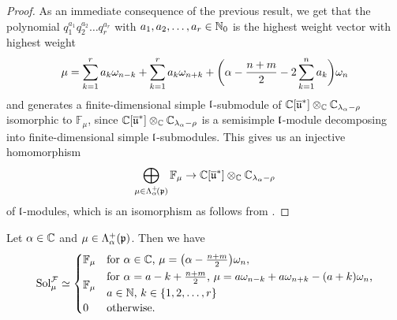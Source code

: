 \begin{proof}
As an immediate consequence of the previous result, we get that the polynomial $q_1^{a_1}q_2^{a_2}\dots q_r^{a_r}$ with $a_1,a_2,\dots,a_r \in \mathbb{N}_0$ is the highest weight vector with highest weight
\begin{align*}
\mu=\sum_{k=1}^r a_k \omega_{n-k} + \sum_{k=1}^r a_k \omega_{n+k} + \bigg(\alpha - {n+m \over 2} - 2\sum_{k=1}^n a_k\bigg) \omega_n
\end{align*}
and generates a finite-dimensional simple $\mathfrak{l}$-submodule of $\mathbb{C}[\overline{\mathfrak{u}}^*] \otimes_{\mathbb{C}} \mathbb{C}_{\lambda_\alpha-\rho}$ isomorphic to $\mathbb{F}_\mu$, since $\mathbb{C}[\overline{\mathfrak{u}}^*] \otimes_{\mathbb{C}} \mathbb{C}_{\lambda_\alpha-\rho}$ is a semisimple $\mathfrak{l}$-module decomposing into finite-dimensional simple $\mathfrak{l}$-submodules. This gives us an injective homomorphism
\begin{align*}
  \bigoplus_{\mu \in \Lambda^+_\alpha\!(\mathfrak{p})} \mathbb{F}_\mu \rightarrow \mathbb{C}[\overline{\mathfrak{u}}^*] \otimes_{\mathbb{C}} \mathbb{C}_{\lambda_\alpha-\rho}
\end{align*}
of $\mathfrak{l}$-modules, which is an isomorphism as follows from \cite{Goodman-Wallach2009}.
\end{proof}

\begin{lemma}\label{lem:solution space AGS}
Let $\alpha \in \mathbb{C}$ and $\mu \in \Lambda^+_\alpha(\mathfrak{p})$. Then we have
\begin{align*}
 \Sol^\mcal{F}_\mu \simeq
 \begin{cases}
   \mathbb{F}_\mu & \text{for $\alpha \in \C$, $\mu = \big(\alpha-{n+m \over 2}\big)\omega_n$}, \\[1mm]
   \mathbb{F}_\mu & \text{$\!\begin{gathered}\text{for $\alpha = a-k+{\textstyle {n+m \over 2}}$, $\mu=a \omega_{n-k} + a\omega_{n+k}-(a+k)\omega_n$,}\\[1mm] \text{$a \in \N$, $k \in \{1,2,\dots,r\}$} \hfill \end{gathered}$} \\[1mm]
   0 & \text{otherwise}.
 \end{cases}
\end{align*}
\end{lemma}

